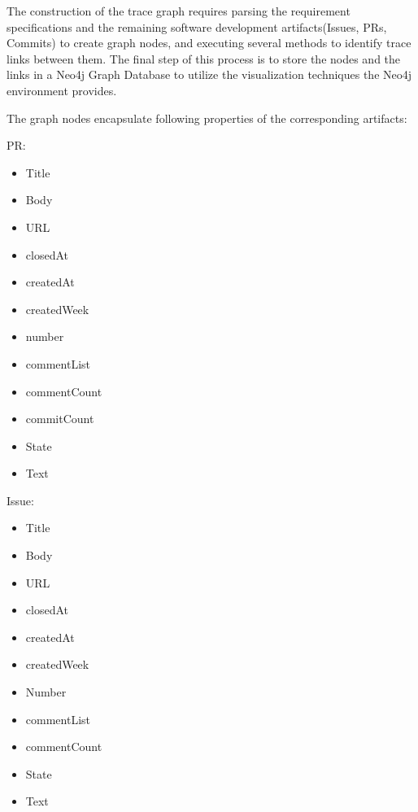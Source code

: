 \documentclass[conference]{IEEEtran}
\begin{document}
The construction of the trace graph requires parsing the requirement specifications and the remaining software development artifacts(Issues, PRs, Commits) to create graph nodes, and executing several methods to identify trace links between them. The final step of this process is to store the nodes and the links in a Neo4j Graph Database to utilize the visualization techniques the Neo4j environment provides.

The graph nodes encapsulate following properties of the corresponding artifacts:

\begin{multicols}{2}

PR:
\begin{itemize}
\item Title
\item Body
\item URL
\item closedAt
\item createdAt
\item createdWeek
\item number
\item commentList
\item commentCount
\item commitCount
\item State
\item Text
\end{itemize}

\columnbreak

Issue:
\begin{itemize}
\item Title
\item Body
\item URL
\item closedAt
\item createdAt
\item createdWeek
\item Number
\item commentList
\item commentCount
\item State
\item Text\\
\end{itemize}

\end{multicols}
\end{document}
